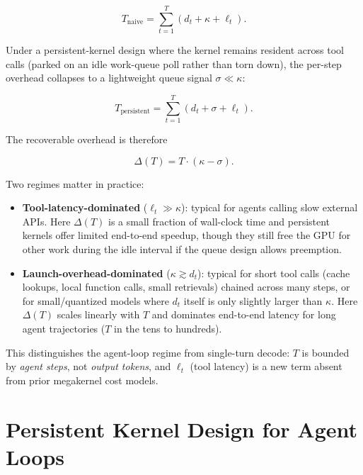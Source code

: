 \documentclass{article}
\begin{document}
\begin{equation}
  T_{\text{naive}} = \sum_{t=1}^{T} \left( d_t + \kappa + \ell_t \right).
  \label{eq:naive}
\end{equation}

Under a persistent-kernel design where the kernel remains resident
across tool calls (parked on an idle work-queue poll rather than
torn down), the per-step overhead collapses to a lightweight queue
signal $\sigma \ll \kappa$:

\begin{equation}
  T_{\text{persistent}} = \sum_{t=1}^{T} \left( d_t + \sigma + \ell_t \right).
  \label{eq:persistent}
\end{equation}

The recoverable overhead is therefore

\begin{equation}
  \Delta(T) = T \cdot (\kappa - \sigma).
  \label{eq:delta}
\end{equation}

Two regimes matter in practice:

\begin{itemize}
  \item \textbf{Tool-latency-dominated} ($\ell_t \gg \kappa$): typical
  for agents calling slow external APIs. Here $\Delta(T)$ is a small
  fraction of wall-clock time and persistent kernels offer limited
  end-to-end speedup, though they still free the GPU for other work
  during the idle interval if the queue design allows preemption.
  \item \textbf{Launch-overhead-dominated} ($\kappa \gtrsim d_t$):
  typical for short tool calls (cache lookups, local function calls,
  small retrievals) chained across many steps, or for small/quantized
  models where $d_t$ itself is only slightly larger than $\kappa$.
  Here $\Delta(T)$ scales linearly with $T$ and dominates end-to-end
  latency for long agent trajectories ($T$ in the tens to hundreds).
\end{itemize}

This distinguishes the agent-loop regime from single-turn decode: $T$
is bounded by \emph{agent steps}, not \emph{output tokens}, and
$\ell_t$ (tool latency) is a new term absent from prior megakernel
cost models.

\section{Persistent Kernel Design for Agent Loops}
\label{sec:design}
\end{document}
